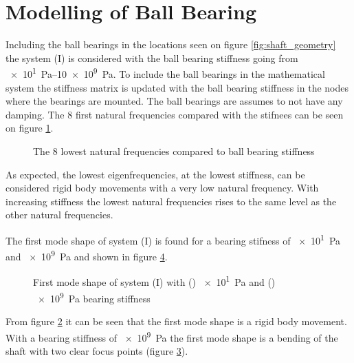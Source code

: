 \section{Modelling of Ball Bearing}
Including the ball bearings in the locations seen on figure \ref{fig:shaft_geometry} the system (I) is considered with the ball bearing stiffness going from \SIrange{e1}{10e9}{\pascal}.
To include the ball bearings in the mathematical system the stiffness matrix is updated with the ball bearing stiffness in the nodes where the bearings are mounted. The ball bearings are assumes to not have any damping.
The 8 first natural frequencies compared with the stifnees can be seen on figure \ref{fig:ball_bearing_stiffness}.
\begin{figure}[ht]
    \centering
    
    \caption{The 8 lowest natural frequencies compared to ball bearing stiffness}
    \label{fig:ball_bearing_stiffness}
\end{figure}
As expected, the lowest eigenfrequencies, at the lowest stiffness, can be considered rigid body movements with a very low natural frequency. With increasing stiffness the lowest natural frequencies rises to the same level as the other natural frequencies.

The first mode shape of system (I) is found for a bearing stifness of \SI{e1}{\pascal} and \SI{e9}{\pascal} and shown in figure \ref{fig:mode_shape}.
\begin{figure}[ht]
    \begin{subfigure}[t]{0.45\textwidth}
        \centering
        
        \caption{}
        \label{fig:mode_shape_low_stiffness}
    \end{subfigure}
    \hfill
    \begin{subfigure}[t]{0.45\textwidth}
        \centering
        
        \caption{}
        \label{fig:mode_shape_high_stiffness}
    \end{subfigure}
    \caption{First mode shape of system (I) with () \SI{e1}{\pascal} and () \SI{e9}{\pascal} bearing stiffness}
    \label{fig:mode_shape}
\end{figure}
From figure \ref{fig:mode_shape_low_stiffness} it can be seen that the first mode shape is a rigid body movement. With a bearing stiffness of \SI{e9}{\pascal} the first mode shape is a bending of the shaft with two clear focus points (figure \ref{fig:mode_shape_high_stiffness}).

